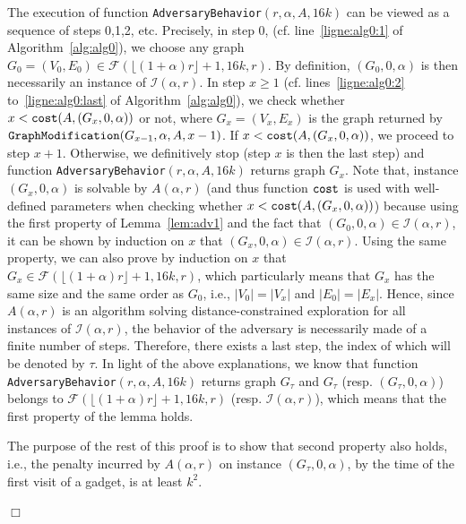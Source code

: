 \documentclass[11pt]{article}
\newcommand{\qed}{\hfill $\Box$ \bigbreak}
\newenvironment{proof}{\noindent {\bf Proof.}}{\qed}
\begin{document}
{\begin{proof}
The execution of function {\tt AdversaryBehavior}$(r,\alpha,A,16k)$ can be viewed as a sequence of steps 0,1,2, etc. Precisely, in step $0$, (cf. line~\ref{ligne:alg0:1} of Algorithm~\ref{alg:alg0}), we choose any graph $G_0=(V_0,E_0)\in\mathcal{F}(\lfloor(1+\alpha)r\rfloor+1,16k,r)$. By definition, $(G_0,0,\alpha)$ is then necessarily an instance of $\mathcal{I}(\alpha,r)$. In step $x\geq1$ (cf. lines~\ref{ligne:alg0:2} to~\ref{ligne:alg0:last} of Algorithm~\ref{alg:alg0}), we check whether $x< {\tt cost}(A,(G_x,0,\alpha))$ or not, where $G_x=(V_x,E_x)$ is the graph returned by ${\tt GraphModification}(G_{x-1},\alpha,A,x-1)$. If $x<{\tt cost}(A,(G_x,0,\alpha))$, we proceed to step $x+1$. Otherwise, we definitively stop (step $x$ is then the last step) and function {\tt AdversaryBehavior}$(r,\alpha,A,16k)$ returns graph $G_x$. Note that, instance $(G_x,0,\alpha)$ is solvable by $A(\alpha,r)$ (and thus function ${\tt cost}$ is used with well-defined parameters when checking whether $x<{\tt cost}(A,(G_x,0,\alpha))$) because using the first property of Lemma~\ref{lem:adv1} and the fact that $(G_0,0,\alpha)\in \mathcal{I}(\alpha,r)$, it can be shown by induction on $x$ that $(G_x,0,\alpha)\in\mathcal{I}(\alpha,r)$. Using the same property, we can also prove by induction on $x$ that $G_x\in\mathcal{F}(\lfloor(1+\alpha)r\rfloor+1,16k,r)$, which particularly means that $G_x$ has the same size and the same order as $G_0$, i.e., $|V_0|=|V_x|$ and $|E_0|=|E_x|$. Hence, since $A(\alpha,r)$ is an algorithm solving distance-constrained exploration for all instances of $\mathcal{I}(\alpha,r)$, the behavior of the adversary is necessarily made of a finite number of steps. Therefore, there exists a last step, the index of which will be denoted by $\tau$. In light of the above explanations, we know that function {\tt AdversaryBehavior}$(r,\alpha,A,16k)$ returns graph $G_{\tau}$ and $G_{\tau}$ (resp. $(G_{\tau},0,\alpha)$) belongs to $\mathcal{F}(\lfloor(1+\alpha)r\rfloor+1,16k,r)$ (resp. $\mathcal{I}(\alpha,r)$), which means that the first property of the lemma holds.


The purpose of the rest of this proof is to show that second property also holds, i.e., the penalty incurred by $A(\alpha,r)$ on instance $(G_{\tau},0,\alpha)$, by the time of the first visit of a gadget, is at least $k^2$.



\end{proof}}
\end{document}
